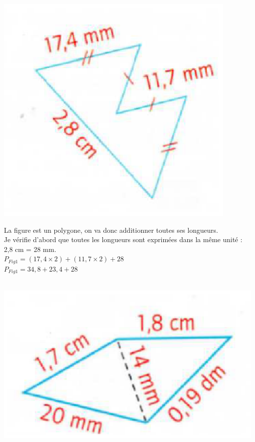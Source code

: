 \documentclass[a4paper,11pt]{article}
\begin{document}
\includegraphics[scale=0.7]{fig1perimetre.eps} \\

\color{red}

La figure est un polygone, on va donc additionner toutes ses longueurs.\\

Je vérifie d'abord que toutes les longueurs sont exprimées dans la même unité :\\

2,8 cm = 28 mm.\\

 $P_{Fig1}= (17,4 \times 2) + (11,7 \times 2 ) + 28$\\
 
  $P_{Fig1}= 34,8 + 23,4 + 28$\\

\\

\color{black}


\columnbreak

\includegraphics[scale=0.7]{fig2perimetre.eps} \\
\end{document}
